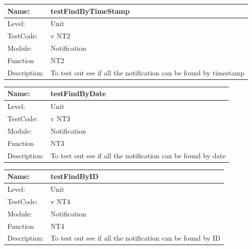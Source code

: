 \documentclass[12pt]{article}
\begin{document}
\begin{center}
\begin{tabular}{|l|p{12cm}|}
\hline

 Name: & testFindByTimeStamp  \\
\hline
Level: & Unit \\
\hline
TestCode: & v NT2 \\
\hline
Module:& Notification\\
\hline
Function & NT2 \\
\hline
Description: & To test out see if all the notification can be found by timestamp \\
\hline

\end{tabular}
\end{center}

\begin{center}
\begin{tabular}{|l|p{12cm}|}
\hline

 Name: & testFindByDate  \\
\hline
Level: & Unit \\
\hline
TestCode: & v NT3 \\
\hline
Module:& Notification\\
\hline
Function & NT3 \\
\hline
Description: & To test out see if all the notification can be found by date \\
\hline

\end{tabular}
\end{center}

\begin{center}
\begin{tabular}{|l|p{12cm}|}
\hline

 Name: & testFindByID  \\
\hline
Level: & Unit \\
\hline
TestCode: & v NT4 \\
\hline
Module:& Notification\\
\hline
Function & NT4 \\
\hline
Description: & To test out see if all the notification can be found by ID \\
\hline

\end{tabular}
\end{center}
\end{document}
